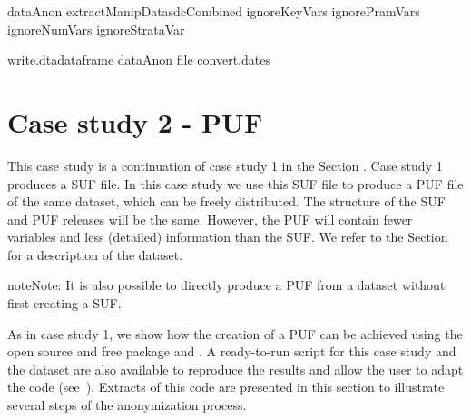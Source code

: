 \documentclass[letterpaper,10pt,english]{sphinxmanual}
\begin{document}
\def\sphinxLiteralBlockLabel{\label{\detokenize{casestudies:code926}}}
%
\begin{sphinxVerbatim}[commandchars=\\\{\},numbers=left,firstnumber=1,stepnumber=1]
dataAnon  extractManipDatasdcCombined ignoreKeyVars   ignorePramVars  
                             ignoreNumVars   ignoreStrataVar  

write.dtadataframe  dataAnon file  convert.dates
\end{sphinxVerbatim}


\section{Case study 2 - PUF}
\label{\detokenize{casestudies:case-study-2-puf}}
This case study is a continuation of case study 1 in the Section
{\hyperref[\detokenize{casestudies:case-study-1-suf}]{}} . Case
study 1 produces a SUF file. In this case study we use this SUF file to
produce a PUF file of the same dataset, which can be freely distributed.
The structure of the SUF and PUF releases will be the same. However, the
PUF will contain fewer variables and less (detailed) information than
the SUF. We refer to the Section {\hyperref[\detokenize{casestudies:case-study-1-suf}]{}}
for a description of the dataset.

\begin{sphinxadmonition}{note}{Note:}
It is also possible to directly produce a PUF from a dataset
without first creating a SUF.
\end{sphinxadmonition}

As in case study 1, we show how the creation of a PUF can be achieved
using the open source and free  package and . A
ready-to-run  script for this case study and the dataset are also
available to reproduce the results and allow the user to adapt the code
(see ). Extracts of this code
are presented in this section to illustrate several steps of the
anonymization process.
\end{document}
